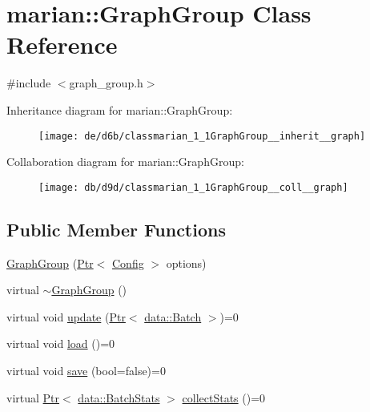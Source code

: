 \hypertarget{classmarian_1_1GraphGroup}{}\section{marian\+:\+:Graph\+Group Class Reference}
\label{classmarian_1_1GraphGroup}


{\ttfamily \#include $<$graph\+\_\+group.\+h$>$}



Inheritance diagram for marian\+:\+:Graph\+Group\+:
\nopagebreak
\begin{figure}[H]
\begin{center}
\leavevmode
\texttt{[image: de/d6b/classmarian\_1\_1GraphGroup\_\_inherit\_\_graph]}
\end{center}
\end{figure}


Collaboration diagram for marian\+:\+:Graph\+Group\+:
\nopagebreak
\begin{figure}[H]
\begin{center}
\leavevmode
\texttt{[image: db/d9d/classmarian\_1\_1GraphGroup\_\_coll\_\_graph]}
\end{center}
\end{figure}
\subsection*{Public Member Functions}
\begin{DoxyCompactItemize}
\item 
\hyperlink{classmarian_1_1GraphGroup_a5d421471110114cb3c6816eb444043df}{Graph\+Group} (\hyperlink{namespacemarian_ad1a373be43a00ef9ce35666145137b08}{Ptr}$<$ \hyperlink{classmarian_1_1Config}{Config} $>$ options)
\item 
virtual \hyperlink{classmarian_1_1GraphGroup_ac425bf61f8a0f9a392a8dce76dc9cf35}{$\sim$\+Graph\+Group} ()
\item 
virtual void \hyperlink{classmarian_1_1GraphGroup_afbb46b2bd868ade2d6f50eff791b6cbc}{update} (\hyperlink{namespacemarian_ad1a373be43a00ef9ce35666145137b08}{Ptr}$<$ \hyperlink{classmarian_1_1data_1_1Batch}{data\+::\+Batch} $>$)=0
\item 
virtual void \hyperlink{classmarian_1_1GraphGroup_ac663af7f403dcf97832afbb4cf07a565}{load} ()=0
\item 
virtual void \hyperlink{classmarian_1_1GraphGroup_ade2dd39ba30033ca9ed48b0ac7be039b}{save} (bool=false)=0
\item 
virtual \hyperlink{namespacemarian_ad1a373be43a00ef9ce35666145137b08}{Ptr}$<$ \hyperlink{classmarian_1_1data_1_1BatchStats}{data\+::\+Batch\+Stats} $>$ \hyperlink{classmarian_1_1GraphGroup_a2654e63f6a13457056c99b1bcb903198}{collect\+Stats} ()=0
\end{DoxyCompactItemize}
